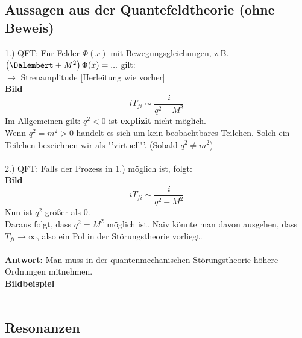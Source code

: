 \subsection{Aussagen aus der Quantefeldtheorie (ohne Beweis)}

1.) QFT: Für Felder $\Phi(x)$ mit Bewegungsgleichungen, z.B. $\left( \Dalembert 
+ M^2 \right) \Phi(x)= ... $ gilt: \\
$\rightarrow$ Streuamplitude [Herleitung wie vorher] \\
\textbf{Bild} \\
\[ iT_{fi} \sim \frac{i}{q^2 - M^2} \]
Im Allgemeinen gilt: $q^2 <0$ ist \textbf{explizit} nicht möglich. \\
Wenn $q^2 = m^2 >0 $ handelt es sich um kein beobachtbares Teilchen. Solch ein 
Teilchen bezeichnen wir als "'virtuell"'. (Sobald $q^2 \ne m^2$) \\
\\
2.) QFT: Falls der Prozess in 1.) möglich ist, folgt: \\
\textbf{Bild}  
\[ iT_{fi} \sim \frac{i}{q^2 - M^2} \] 
Nun ist $q^2$ größer als 0. \\
Daraus folgt, dass $q^2 = M^2$ möglich ist. Naiv könnte man davon ausgehen, 
dass $T_{fi} \to \infty$, also ein Pol in der Störungstheorie vorliegt. \\
\\
\textbf{Antwort:} Man muss in der quantenmechanischen Störungstheorie höhere 
Ordnungen mitnehmen. \\
\textbf{Bildbeispiel}\\
\\
\subsection{Resonanzen}

